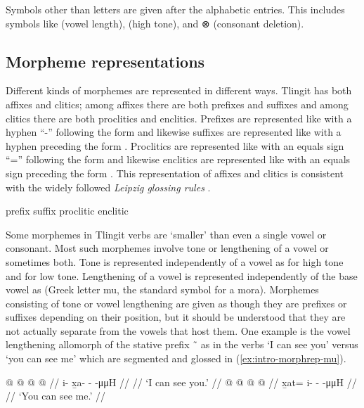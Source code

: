 Symbols other than letters are given after the alphabetic entries.
This includes symbols like  (vowel length),  (high tone), and ⊗ (consonant deletion). 

\subsection{Morpheme representations}\label{sec:intro-morphrep}

Different kinds of morphemes are represented in different ways.
Tlingit has both affixes and clitics; among affixes there are both prefixes and suffixes and among clitics there are both proclitics and enclitics.
Prefixes are represented like  with a hyphen “-” following the form  and likewise suffixes are represented like  with a hyphen preceding the form .
Proclitics are represented like  with an equals sign “=” following the form  and likewise enclitics are represented like  with an equals sign preceding the form .
This representation of affixes and clitics is consistent with the widely followed \textit{Leipzig glossing rules} \parencite{comrie:2008}.

\pex
\a	prefix 
\a	suffix 
\a	proclitic 
\a	enclitic 
\xe

Some morphemes in Tlingit verbs are ‘smaller’ than even a single vowel or consonant.
Most such morphemes involve tone or lengthening of a vowel or sometimes both.
Tone is represented independently of a vowel as  for high tone and  for low tone.
Lengthening of a vowel is represented independently of the base vowel as  (Greek letter mu, the standard symbol for a mora).
Morphemes consisting of tone or vowel lengthening are given as though they are prefixes or suffixes depending on their position, but it should be understood that they are not actually separate from the  vowels that host them.
One example is the vowel lengthening allomorph  of the stative prefix  \~\  as in the verbs  ‘I can see you’ versus  ‘you can see me’ which are segmented and glossed in (\ref{ex:intro-morphrep-mu}).

\pex\label{ex:intro-morphrep-mu}%
\a\label{ex:intro-morphrep-mu-1>2}%
\begingl
	\gla	{} @ {} @ {} @ {} @ {} //
	\glb	i- x̱a- -  -μμH //
	\glc	{}\· \· \·  \· //
	\glft	‘I can see you.’
		//
\endgl
\a\label{ex:intro-morphrep-mu-2>1}%
\begingl
	\gla	{} @ {} @ {} @ {} @ {} //
	\glb	x̱at= i- -  -μμH //
	\glc	{}\· \· \·  \· //
	\glft	‘You can see me.’
		//
\endgl
\xe

